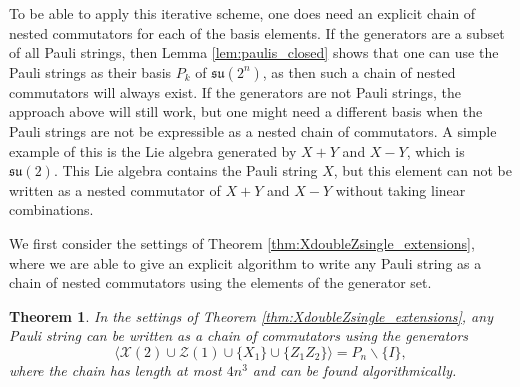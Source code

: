\documentclass[12pt, a4-paper]{amsart}
\newcommand{\cX}{\mathcal{X}}
\newcommand{\cZ}{\mathcal{Z}}
\newcommand{\mf}[1]{\mathfrak{#1}}
\numberwithin{equation}{section}
\newtheorem{theorem}[lemma]{Theorem}
\begin{document}
To be able to apply this iterative scheme, one does need an explicit chain of nested commutators for each of the basis elements. If the generators are a subset of all Pauli strings, then Lemma \ref{lem:paulis_closed} shows that one can use the Pauli strings as their basis $P_k$ of $\mf{su}(2^n)$, as then such a chain of nested commutators will always exist. If the generators are not Pauli strings, the approach above will still work, but one might need a different basis when the Pauli strings are not be expressible as a nested chain of commutators. A simple example of this is the Lie algebra generated by $X+Y$ and $X-Y$, which is $\mf{su}(2)$. This Lie algebra contains the Pauli string $X$, but this element can not be written as a nested commutator of $X+Y$ and $X-Y$ without taking linear combinations.

We first consider the settings of Theorem \ref{thm:XdoubleZsingle_extensions}, where we are able to give an explicit algorithm to write any Pauli string as a chain of nested commutators using the elements of the generator set.
\begin{theorem}\label{thm:commutators_algorithmically}
    In the settings of Theorem \ref{thm:XdoubleZsingle_extensions}, any Pauli string can be written as a chain of commutators using the generators
    \begin{equation}
        \langle \cX(2) \cup \cZ(1) \cup \{X_1\} \cup \{Z_1 Z_2\} \rangle = P_n \backslash \{I \},
    \end{equation}
    where the chain has length at most $4n^3$ and can be found algorithmically.
\end{theorem}
\end{document}
